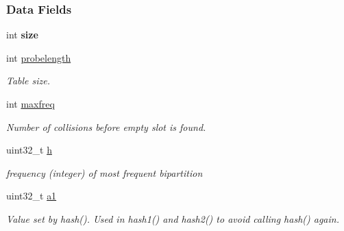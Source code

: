 \subsubsection*{Data Fields}
\begin{DoxyCompactItemize}
\item 
\mbox{\label{structbip__hashtable__struct_a12c1565ff6c6070f7d478bf8aa944432}} 
int {\bfseries size}
\item 
\mbox{\label{structbip__hashtable__struct_a25e9a1bf231580249c88a75e6b714c15}} 
int \hyperlink{structbip__hashtable__struct_a25e9a1bf231580249c88a75e6b714c15}{probelength}
\begin{DoxyCompactList}\small\item\em Table size. \end{DoxyCompactList}\item 
\mbox{\label{structbip__hashtable__struct_abb13b3f66308184429bca8b7f4a5f67f}} 
int \hyperlink{structbip__hashtable__struct_abb13b3f66308184429bca8b7f4a5f67f}{maxfreq}
\begin{DoxyCompactList}\small\item\em Number of collisions before empty slot is found. \end{DoxyCompactList}\item 
\mbox{\label{structbip__hashtable__struct_a25524e54647fc07fef816a68b253d18f}} 
uint32\+\_\+t \hyperlink{structbip__hashtable__struct_a25524e54647fc07fef816a68b253d18f}{h}
\begin{DoxyCompactList}\small\item\em frequency (integer) of most frequent bipartition \end{DoxyCompactList}\item 
\mbox{\label{structbip__hashtable__struct_a0ff51403063e40a6c0e50c011450eaef}} 
uint32\+\_\+t \hyperlink{structbip__hashtable__struct_a0ff51403063e40a6c0e50c011450eaef}{a1}
\begin{DoxyCompactList}\small\item\em Value set by hash(). Used in hash1() and hash2() to avoid calling hash() again. \end{DoxyCompactList}\item 

\end{DoxyCompactItemize}
